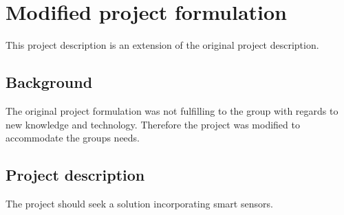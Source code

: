 \section{Modified project formulation}
This project description is an extension of the original project description. 
\subsection{Background}
The original project formulation was not fulfilling to the group with regards to new knowledge and technology. Therefore the project was modified to accommodate the groups needs.

\subsection{Project description}
The project should seek a solution incorporating smart sensors.

